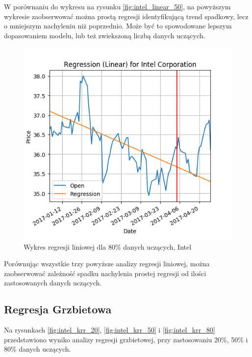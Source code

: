 W porównaniu do wykresu na rysunku \ref{fig:intel_linear_50}, na powyższym wykresie zaobserwować można prostą regresji identyfikującą trend spadkowy, lecz o mniejszym nachyleniu niż poprzednio.
Może być to spowodowane lepszym dopasowaniem modelu, lub też zwiekszoną liczbą danych uczących.\\

\begin{figure}[h!]
\centering
\includegraphics[width=150mm]{pictures/plots/intel_linear_80.png}
\caption{Wykres regresji liniowej dla 80\% danych uczących, Intel}
\label{fig:intel_linear_80}
\end{figure}

Porównując wszystkie trzy powyższe analizy regresji liniowej, można zaobserwować zależność spadku nachylenia prostej regresji od ilości zastosowanych danych uczących.

\subsection{Regresja Grzbietowa}

Na rysunkach \ref{fig:intel_krr_20}, \ref{fig:intel_krr_50} i \ref{fig:intel_krr_80} przedstawiono wyniko analizy regresji grzbietowej, przy zastosowaniu 20\%, 50\% i 80\% danych uczących.\\

